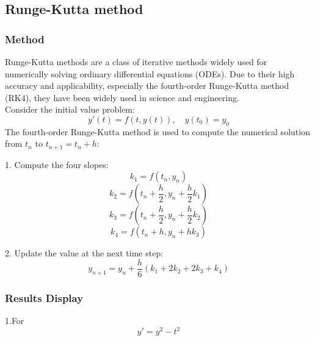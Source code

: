 \documentclass{article}
\begin{document}
\subsection{Runge-Kutta method}

\subsubsection{Method}
Runge-Kutta methods are a class of iterative methods widely used for numerically solving ordinary differential equations (ODEs). Due to their high accuracy and applicability, especially the fourth-order Runge-Kutta method (RK4), they have been widely used in science and engineering. \\
Consider the initial value problem:
\[
y'(t) = f(t, y(t)), \quad y(t_0) = y_0
\]
The fourth-order Runge-Kutta method is used to compute the numerical solution from \( t_n \) to \( t_{n+1} = t_n + h \):

1. Compute the four slopes:
   \[
   k_1 = f(t_n, y_n)
   \]
   \[
   k_2 = f\left( t_n + \frac{h}{2}, y_n + \frac{h}{2} k_1 \right)
   \]
   \[
   k_3 = f\left( t_n + \frac{h}{2}, y_n + \frac{h}{2} k_2 \right)
   \]
   \[
   k_4 = f\left( t_n + h, y_n + h k_3 \right)
   \]

2. Update the value at the next time step:
   \[
   y_{n+1} = y_n + \frac{h}{6} (k_1 + 2k_2 + 2k_3 + k_4)
   \]
\subsubsection{Results Display}
1.For \[
y' = y^2 - t^2
\]
\end{document}
